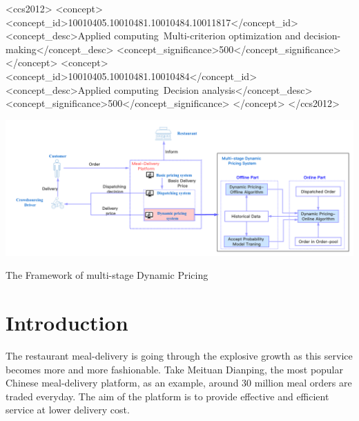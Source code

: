 \documentclass[sigconf,authordraft]{acmart}
\begin{document}
\begin{CCSXML}
<ccs2012>
   <concept>
       <concept_id>10010405.10010481.10010484.10011817</concept_id>
       <concept_desc>Applied computing~Multi-criterion optimization and decision-making</concept_desc>
       <concept_significance>500</concept_significance>
       </concept>
   <concept>
       <concept_id>10010405.10010481.10010484</concept_id>
       <concept_desc>Applied computing~Decision analysis</concept_desc>
       <concept_significance>500</concept_significance>
       </concept>
 </ccs2012>
\end{CCSXML}



\begin{teaserfigure}
\centering
  \includegraphics[width=\columnwidth]{teaser.png}
  \caption{The Framework of multi-stage Dynamic Pricing}
  \label{fig:teaser}
\end{teaserfigure}

\maketitle

\section{Introduction}
 The restaurant meal-delivery is going through the explosive growth as this service becomes more and more fashionable. Take Meituan Dianping, the most popular Chinese meal-delivery platform, as an example, around 30 million meal orders are traded everyday. The aim of the platform is to provide effective and efficient service at lower delivery cost. 
 
\end{document}

